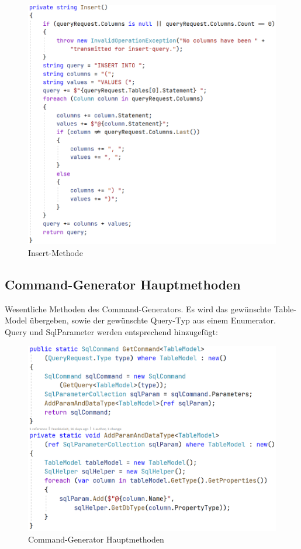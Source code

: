 \documentclass[11pt,toc=sectionentrywithoutdots, 
headheight=44pt, headings=optiontoheadandtoc, hyperfootnotes=false, hypertexnames=false]{scrartcl}
\begin{document}
 \begin{figure}[H]
 \centering

	\includegraphics[scale=0.7]{insert.PNG}
	 \caption{Insert-Methode}
 \end{figure}
 \clearpage
 
    \subsection{Command-Generator Hauptmethoden}
Wesentliche Methoden des Command-Generators. Es wird das gewünschte Table-Model übergeben, sowie der gewünschte Query-Typ aus einem Enumerator. Query und SqlParameter werden entsprechend hinzugefügt:
 \label{fig:Command-Generator Hauptmethoden}

 \begin{figure}[H]

	\includegraphics[scale=0.6]{commandGenerator.PNG}
	 \caption{Command-Generator Hauptmethoden}
 \end{figure}
 \clearpage
 
\end{document}

